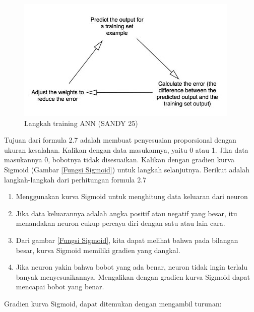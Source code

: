 \begin{figure}[H]
	\vspace{-0.1cm}
	\begin{center}
		\includegraphics[width=0.9\columnwidth]{bab2/Gambar/Langkah training ANN.jpg}
	\end{center}
	\vspace{-0.2cm}
	\caption{Langkah training ANN (SANDY 25)}\label{Langkah training ANN}
\end{figure}

Tujuan dari formula 2.7 adalah membuat penyesuaian proporsional dengan ukuran kesalahan. Kalikan dengan data masukannya, yaitu 0 atau  1. Jika data masukannya 0, bobotnya tidak disesuaikan. Kalikan dengan gradien kurva Sigmoid (Gambar \ref{Fungsi Sigmoid}) untuk langkah selanjutnya. Berikut adalah langkah-langkah dari perhitungan formula 2.7

\begin{enumerate}
	\item Menggunakan kurva Sigmoid untuk menghitung data keluaran dari neuron
	\item Jika data keluarannya adalah angka positif atau negatif yang besar, itu menandakan neuron cukup percaya diri dengan satu atau lain cara.
	\item Dari gambar \ref{Fungsi Sigmoid}, kita dapat melihat bahwa pada bilangan besar, kurva Sigmoid memiliki gradien yang dangkal.
	\item Jika neuron yakin bahwa bobot yang ada benar, neuron tidak ingin terlalu banyak menyesuaikannya. Mengalikan dengan gradien kurva Sigmoid dapat mencapai bobot yang benar.
\end{enumerate}

Gradien kurva Sigmoid, dapat ditemukan dengan mengambil turunan:


